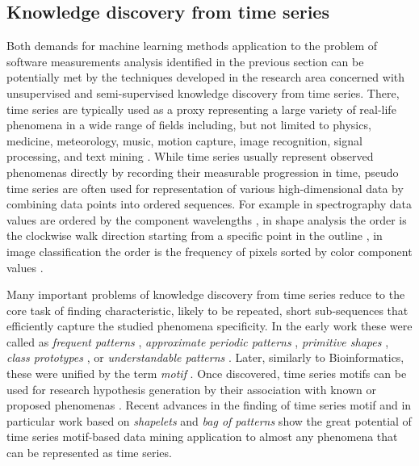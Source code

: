 %
%
\subsection{Knowledge discovery from time series}\label{section_timeseries_kdd}
Both demands for machine learning methods application to the problem of software measurements analysis
identified in the previous section can be potentially met by the techniques developed in the research 
area concerned with unsupervised and semi-supervised knowledge discovery from time series.
There, time series are typically used as a proxy representing a large variety of real-life 
phenomena in a wide range of fields including, but not limited to physics, medicine, meteorology, music, 
motion capture, image recognition, signal processing, and text mining \cite{citeulike:11796594}. 
While time series usually represent observed phenomenas directly by recording their measurable 
progression in time, pseudo time series are often used for representation of various high-dimensional 
data by combining data points into ordered sequences. 
For example in spectrography data values are ordered by the component wavelengths \cite{citeulike:12550833},
in shape analysis the order is the clockwise walk direction starting from a specific point in the outline 
\cite{citeulike:12550835}, in image classification the order is the frequency of pixels sorted by color component 
values \cite{citeulike:2900542}.

Many important problems of knowledge discovery from time series reduce to the core task of finding 
characteristic, likely to be repeated, short sub-sequences that efficiently capture the studied 
phenomena specificity. In the early work these were called as 
\textit{frequent patterns} \cite{citeulike:5159615}, 
\textit{approximate periodic patterns} \cite{citeulike:1959582},
\textit{primitive shapes} \cite{citeulike:5898869}, 
\textit{class prototypes} \cite{citeulike:4406444}, 
or \textit{understandable patterns} \cite{citeulike:3978076}. 
Later, similarly to Bioinformatics, these were unified by the term \textit{motif} \cite{citeulike:3977965}.
Once discovered, time series motifs can be used for research hypothesis generation by their association 
with known or proposed phenomenas \cite{citeulike:3977965}. 
Recent advances in the finding of time series motif and in particular work based on \textit{shapelets} 
\cite{citeulike:7344347} \cite{citeulike:11957982} \cite{citeulike:12552293} and \textit{bag of patterns} 
\cite{citeulike:10525778} show the great potential of time series motif-based data mining application
to almost any phenomena that can be represented as time series.

